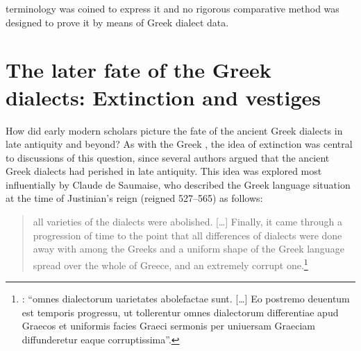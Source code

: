 terminology was coined to express it and no rigorous comparative method was designed to prove it by means of Greek dialect data.

\section{The later fate of the Greek dialects: Extinction and vestiges}\label{sec:5.5}

How did early modern scholars picture the fate of the ancient Greek dialects in late antiquity and beyond? As with the Greek , the idea of extinction was central to discussions of this question, since several authors argued that the ancient Greek dialects had perished in late antiquity. This idea was explored most influentially by Claude de Saumaise, who described the Greek language situation at the time of Justinian’s reign (reigned 527–565) as follows:

\begin{quote}
all varieties of the dialects were abolished. […] Finally, it came through a progression of time to the point that all differences of dialects were done away with among the Greeks and a uniform shape of the Greek language spread over the whole of Greece, and an extremely corrupt one.\footnote{\citet[446--447]{Saumaise1643a}: “omnes dialectorum uarietates abolefactae sunt. […] Eo postremo deuentum est temporis progressu, ut tollerentur omnes dialectorum differentiae apud Graecos et uniformis facies Graeci sermonis per uniuersam Graeciam diffunderetur eaque corruptissima”.}
\end{quote}

